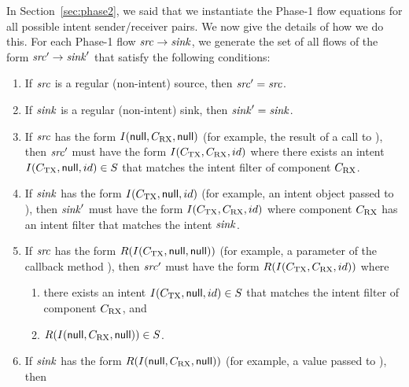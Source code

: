 
In Section~\ref{sec:phase2}, we said that we instantiate the Phase-1 flow
equations for all possible intent sender/receiver pairs.  We now give the
details of how we do this.
For each Phase-1 flow $\mathit{src} \to \mathit{sink}$, we generate the set of all flows of the
form $\mathit{src}' \to \mathit{sink}'$ that satisfy the following conditions:
\begin{sloppypar}
\begin{enumerate}%
\item 
    If $\mathit{src}$ is a regular (non-intent) source, then $\mathit{src}' = \mathit{src}$.
\item 
    If $\mathit{sink}$ is a regular (non-intent) sink, then $\mathit{sink}' = \mathit{sink}$.
\item 
    If $\mathit{src}$ has the form $I(\textsf{null}, C_{\rm RX}, \textsf{null})$ (for example, the
    result of a call to ), then
    $\mathit{src}'$ must have the form $I(C_{\rm TX}, C_{\rm RX}, id)$
    where there exists an intent $I(C_{\rm TX}, \textsf{null}, id) \in S$
    that matches the intent filter of component $C_{\rm RX}$.
\item
    If $\mathit{sink}$ has the form $I(C_{\rm TX}, \textsf{null}, id)$ (for example, an intent
    object passed to ), then
    $\mathit{sink}'$ must have the form $I(C_{\rm TX}, C_{\rm RX}, id)$
    where component $C_{\rm RX}$ has an intent filter that matches the
    intent $\mathit{sink}$.
\item
    If $\mathit{src}$ has the form $R(I(C_{\rm TX}, \textsf{null}, \textsf{null}))$ (for example, a
    parameter of the callback method ), then 
    $\mathit{src}'$ must have the form $R(I(C_{\rm TX}, C_{\rm RX}, id))$ where 
    \begin{enumerate}
    \item
	there exists an intent $I(C_{\rm TX}, \textsf{null}, id) \in S$ that matches the
	intent filter of component $C_{\rm RX}$, and
    \item
	$R(I(\textsf{null}, C_{\rm RX}, \textsf{null})) \in S$.
    \end{enumerate}
\item
    If $\mathit{sink}$ has the form $R(I(\textsf{null}, C_{\rm RX}, \textsf{null}))$ (for example, a
    value passed to ), then 

\end{enumerate}
\end{sloppypar}
